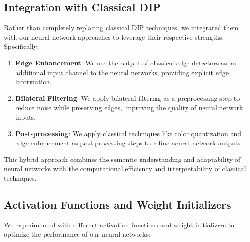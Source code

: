 \documentclass[conference]{IEEEtran}
\begin{document}
\subsection{Integration with Classical DIP}
Rather than completely replacing classical DIP techniques, we integrated them with our neural network approaches to leverage their respective strengths. Specifically:

\begin{enumerate}
    \item \textbf{Edge Enhancement}: We use the output of classical edge detectors as an additional input channel to the neural networks, providing explicit edge information.
    \item \textbf{Bilateral Filtering}: We apply bilateral filtering as a preprocessing step to reduce noise while preserving edges, improving the quality of neural network inputs.
    \item \textbf{Post-processing}: We apply classical techniques like color quantization and edge enhancement as post-processing steps to refine neural network outputs.
\end{enumerate}

This hybrid approach combines the semantic understanding and adaptability of neural networks with the computational efficiency and interpretability of classical techniques.

\subsection{Activation Functions and Weight Initializers}
We experimented with different activation functions and weight initializers to optimize the performance of our neural networks:
\end{document}
